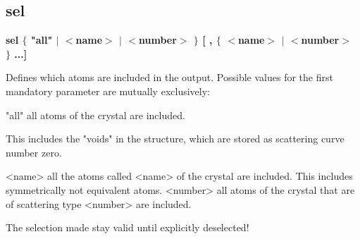 \subsection*{sel}
{\bf sel $ \{$ "all" $| $ $ <$name$> $ $| $ $ <$number$> $ $\} $ [ , $ \{$ $ <$name$> $ $| $ $ <$number$> $ $\} $ ...] \par }
\par
\vspace{3pt}
Defines which atoms are included in the output. Possible values 
for the first mandatory parameter are mutually exclusively: 
\par
\begin{MacVerbatim}
"all"     all atoms of the crystal are included.
\end{MacVerbatim}
          This includes the "voids" in the structure, which are stored 
          as scattering curve number zero. 
\begin{MacVerbatim}
<name>    all the atoms called <name> of the crystal are included.
          This includes symmetrically not equivalent atoms.
<number>  all atoms of the crystal that are of scattering type <number>
          are included.
\end{MacVerbatim}
The selection made stay valid until explicitly deselected! 
